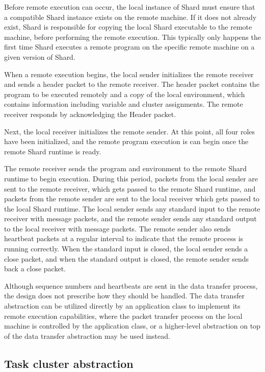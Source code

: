 \documentclass[twoside]{report}
\begin{document}
Before remote execution can occur, the local instance of Shard must ensure that a compatible Shard instance exists on the remote machine.
If it does not already exist, Shard is responsible for copying the local Shard executable to the remote machine, before performing the remote execution.
This typically only happens the first time Shard executes a remote program on the specific remote machine on a given version of Shard.

When a remote execution begins, the local sender initializes the remote receiver and sends a header packet to the remote receiver.
The header packet contains the program to be executed remotely and a copy of the local environment, which contains information including variable and cluster assignments.
The remote receiver responds by acknowledging the Header packet.

Next, the local receiver initializes the remote sender.
At this point, all four roles have been initialized, and the remote program execution is can begin once the remote Shard runtime is ready.

The remote receiver sends the program and environment to the remote Shard runtime to begin execution.
During this period, packets from the local sender are sent to the remote receiver, which gets passed to the remote Shard runtime, and packets from the remote sender are sent to the local receiver which gets passed to the local Shard runtime.
The local sender sends any standard input to the remote receiver with message packets, and the remote sender sends any standard output to the local receiver with message packets.
The remote sender also sends heartbeat packets at a regular interval to indicate that the remote process is running correctly.
When the standard input is closed, the local sender sends a close packet, and when the standard output is closed, the remote sender sends back a close packet.

Although sequence numbers and heartbeats are sent in the data transfer process, the design does not prescribe how they should be handled.
The data transfer abstraction can be utilized directly by an application class to implement its remote execution capabilities, where the packet transfer process on the local machine is controlled by the application class, or a higher-level abstraction on top of the data transfer abstraction may be used instead.

\subsection{Task cluster abstraction}
\end{document}

